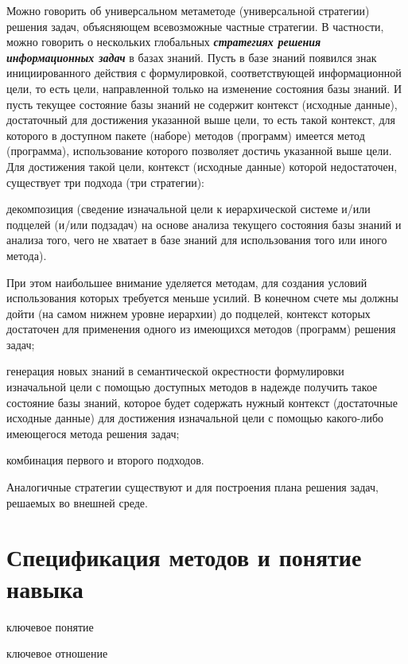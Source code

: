 Можно говорить об универсальном метаметоде (универсальной стратегии) решения задач, объясняющем всевозможные частные стратегии.
В частности, можно говорить о нескольких глобальных \textbf{\textit{стратегиях решения информационных задач}} в базах знаний. Пусть в базе знаний появился знак инициированного действия с формулировкой, соответствующей информационной цели, то есть цели, направленной только на изменение состояния базы знаний. И пусть текущее состояние базы знаний не содержит контекст (исходные данные), достаточный для достижения указанной выше цели, то есть такой контекст, для которого в доступном пакете (наборе) методов (программ) имеется метод (программа), использование которого позволяет достичь указанной выше цели. Для достижения такой цели, контекст (исходные данные) которой недостаточен, существует три подхода (три стратегии):
\begin{textitemize}
	\item декомпозиция (сведение изначальной цели к иерархической системе и/или подцелей (и/или подзадач) на основе анализа текущего состояния базы знаний и анализа того, чего не хватает в базе знаний для использования того или иного метода).

	При этом наибольшее внимание уделяется методам, для создания условий использования которых требуется меньше усилий. В конечном счете мы должны дойти (на самом нижнем уровне иерархии) до подцелей, контекст которых достаточен для применения одного из имеющихся методов (программ) решения задач;
	\item генерация новых знаний в семантической окрестности формулировки изначальной цели с помощью  доступных методов в надежде получить такое состояние базы знаний, которое будет содержать нужный контекст (достаточные исходные данные) для достижения изначальной цели с помощью какого-либо имеющегося метода решения задач;
	\item комбинация первого и второго подходов.
\end{textitemize}
Аналогичные стратегии существуют и для построения плана решения задач, решаемых во внешней среде.

\section{Спецификация методов и понятие навыка}
\label{sec_skill_concept}
\begin{SCn}
	\begin{scnrelfromlist}{ключевое понятие}
	\end{scnrelfromlist}

	\begin{scnrelfromlist}{ключевое отношение}
	\end{scnrelfromlist}
\end{SCn}

